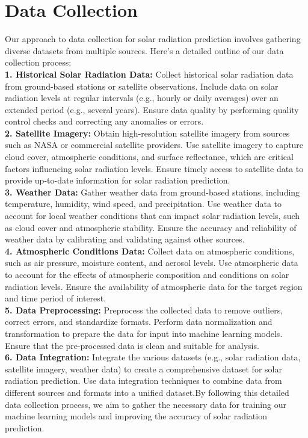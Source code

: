 \documentclass[12pt,a4paper]{report}
\begin{document}
\section{Data Collection} 
Our approach to data collection for solar radiation prediction involves gathering 
diverse datasets from multiple sources. Here's a detailed outline of our data collection 
process: \\
\textbf{1. Historical Solar Radiation Data:} Collect historical solar radiation data from 
ground-based stations or satellite observations. Include data on solar radiation levels at 
regular intervals (e.g., hourly or daily averages) over an extended period (e.g., several 
years). Ensure data quality by performing quality control checks and correcting any 
anomalies or errors. \\
\textbf{2. Satellite Imagery:} Obtain high-resolution satellite imagery from sources such as 
NASA or commercial satellite providers. Use satellite imagery to capture cloud cover, 
atmospheric conditions, and surface reflectance, which are critical factors influencing 
solar radiation levels. Ensure timely access to satellite data to provide up-to-date 
information for solar radiation prediction. \\
\textbf{3. Weather Data:} Gather weather data from ground-based stations, including 
temperature, humidity, wind speed, and precipitation. Use weather data to account for 
local weather conditions that can impact solar radiation levels, such as cloud cover 
and atmospheric stability. Ensure the accuracy and reliability of weather data by 
calibrating and validating against other sources.\\ 
\textbf{4. Atmospheric Conditions Data:} Collect data on atmospheric conditions, such as air 
pressure, moisture content, and aerosol levels. Use atmospheric data to account for the 
effects of atmospheric composition and conditions on solar radiation levels. Ensure 
the availability of atmospheric data for the target region and time period of interest. \\
\textbf{5. Data Preprocessing:} Preprocess the collected data to remove outliers, correct 
errors, and standardize formats. Perform data normalization and transformation to 
prepare the data for input into machine learning models. Ensure that the pre-processed 
data is clean and suitable for analysis. \\
\textbf{6. Data Integration:} Integrate the various datasets (e.g., solar radiation data, satellite 
imagery, weather data) to create a comprehensive dataset for solar radiation 
prediction. Use data integration techniques to combine data from different sources and 
formats into a unified dataset.By following this detailed data collection process, we 
aim to gather the necessary data for training our machine learning models and 
improving the accuracy of solar radiation prediction. 
\end{document}

